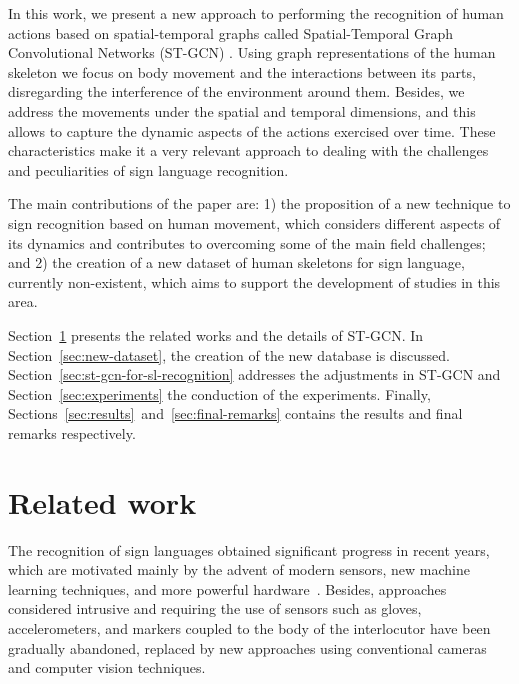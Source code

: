 In this work, we present a new approach to performing the recognition of human actions based on spatial-temporal graphs called Spatial-Temporal Graph Convolutional Networks (ST-GCN) \cite {st-gcn-2018}. Using graph representations of the human skeleton we focus on body movement and the interactions between its parts, disregarding the interference of the environment around them. Besides, we address the movements under the spatial and temporal dimensions, and this allows to capture the dynamic aspects of the actions exercised over time. These characteristics make it a very relevant approach to dealing with the challenges and peculiarities of sign language recognition.
 

The main contributions of the paper are: 1) the proposition of a new technique to sign recognition based on human movement, which considers different aspects of its dynamics and contributes to overcoming some of the main field challenges; and 2) the creation of a new dataset of human skeletons for sign language, currently non-existent, which aims to support the development of studies in this area.

Section~\ref{sec:related-work} presents the related works and the details of ST-GCN. In Section~\ref{sec:new-dataset},  the creation of the new database is discussed.
Section~\ref{sec:st-gcn-for-sl-recognition} addresses the adjustments in ST-GCN and Section~\ref{sec:experiments} the conduction of the experiments. Finally, Sections~\ref{sec:results}~and~\ref{sec:final-remarks} contains the results and final remarks respectively.



\section{Related work}
\label{sec:related-work}

The recognition of sign languages obtained significant progress in recent years, which are motivated mainly by the advent of modern sensors, new machine learning techniques, and more powerful hardware~\cite{recent-advances-dl-2017,recent-advances-sl-2013}. Besides, approaches considered intrusive and requiring the use of sensors such as gloves, accelerometers, and markers coupled to the body of the interlocutor have been gradually abandoned, replaced by new approaches using conventional cameras and computer vision techniques.

